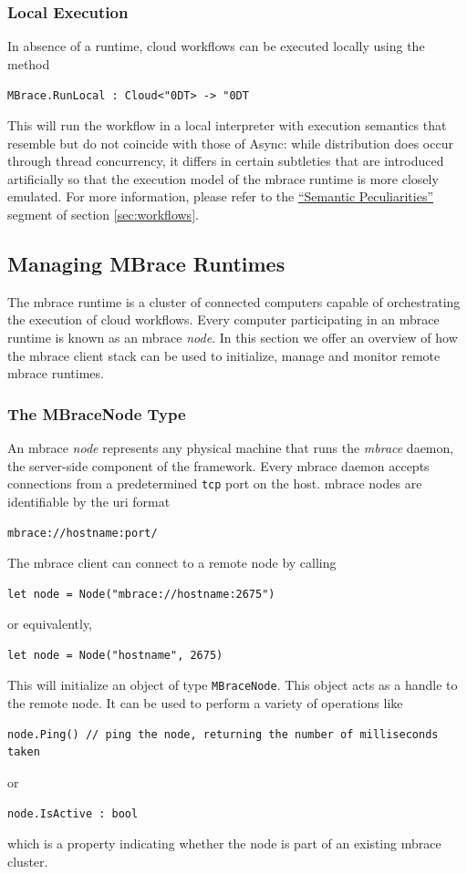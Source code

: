 \documentclass[9pt,a4paper]{article}
\newcommand{\mbrace}{mbrace}
\newcommand{\Mbrace}{\mbrace}
\newcommand{\TitularMbrace}{MBrace}
\newcommand{\centertt}[1]{\begin{center}\texttt{#1}\end{center}}
\newcommand{\uq}{\char"0D}
\begin{document}
\subsubsection*{Local Execution}

In absence of a runtime, cloud workflows can be executed locally using the method
%
\centertt{MBrace.RunLocal : Cloud<\uq{}T> -> \uq{}T}
%
This will run the workflow in a local interpreter with execution semantics that resemble
but do not coincide with those of Async: while distribution does occur through thread 
concurrency, it differs in certain subtleties that are introduced artificially so that 
the execution model of the \mbrace{} runtime is more closely emulated.
For more information, please refer to the \href{peculiarities}{``Semantic Peculiarities''}
segment of section \ref{sec:workflows}.

\subsection{Managing \TitularMbrace{} Runtimes}

The \mbrace{} runtime is a cluster of connected computers capable of orchestrating the execution
of cloud workflows. Every computer participating in an \mbrace{} runtime is known as an \mbrace{}
\emph{node}. In this section we offer an overview of how the \mbrace{} client stack can be
used to initialize, manage and monitor remote \mbrace{} runtimes.

\subsubsection*{The MBraceNode Type}

An \mbrace{} \emph{node} represents any physical machine that runs the \emph{\mbrace{}} daemon, 
the server-side component of the framework. Every \mbrace{} daemon accepts connections from a predetermined 
\texttt{tcp} port on the host. \Mbrace{} nodes are identifiable by the uri format
\centertt{mbrace://hostname:port/}
The \mbrace{} client can connect to a remote node by calling
\begin{lstlisting}
let node = Node("mbrace://hostname:2675")
\end{lstlisting}
or equivalently,
\begin{lstlisting}
let node = Node("hostname", 2675)
\end{lstlisting}
This will initialize an object of type \texttt{MBraceNode}. This object acts as a handle
to the remote node. It can be used to perform a variety of operations like
\begin{lstlisting}
node.Ping() // ping the node, returning the number of milliseconds taken
\end{lstlisting}
or
\begin{lstlisting}
node.IsActive : bool
\end{lstlisting}
which is a property indicating whether the node is part of an existing \mbrace{} cluster.
\end{document}
